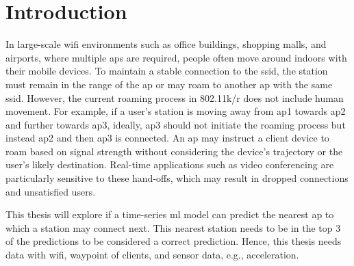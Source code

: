 \chapter{Introduction}\label{sec:intro}

In large-scale \ac{wifi} environments such as office buildings, shopping malls, and airports, where multiple \acp{ap} are required, people often move around indoors with their mobile devices.
To maintain a stable connection to the \ac{ssid}, the station must remain in the range of the \ac{ap} or may roam to another \ac{ap} with the same \ac{ssid}.
However, the current roaming process in 802.11k/r \cite{802.11k}\cite{802.11r} does not include human movement.
For example, if a user's station is moving away from \ac{ap}1 towards \ac{ap}2 and further towards \ac{ap}3, ideally, \ac{ap}3 should not initiate the roaming process but instead \ac{ap}2 and then \ac{ap}3 is connected.
An \ac{ap} may instruct a client device to roam based on signal strength without considering the device's trajectory or the user's likely destination.
Real-time applications such as video conferencing are particularly sensitive to these hand-offs, which may result in dropped connections and unsatisfied users.

This thesis will explore if a time-series \ac{ml} model can predict the nearest \ac{ap} to which a station  may connect next.
This nearest station needs to be in the top 3 of the predictions to be considered a correct prediction.
Hence, this thesis needs data with \ac{wifi}, waypoint of clients, and sensor data, e.g., acceleration.

